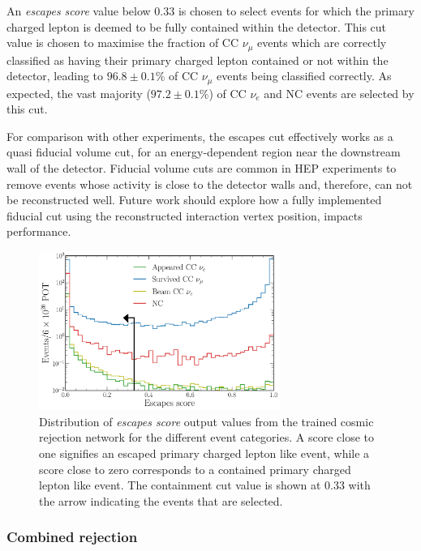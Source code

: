 An \emph{escapes score} value below $0.33$ is chosen to select events for which the primary
charged lepton is deemed to be fully contained within the detector. This cut value is chosen to
maximise the fraction of CC $\nu_{\mu}$ events which are correctly classified as having their
primary charged lepton contained or not within the detector, leading to $96.8\pm0.1\%$ of CC
$\nu_{\mu}$ events being classified correctly. As expected, the vast majority ($97.2\pm0.1\%$) of
CC $\nu_{e}$ and NC events are selected by this cut.

For comparison with other experiments, the escapes cut effectively works as a quasi fiducial
volume cut, for an energy-dependent region near the downstream wall of the detector. Fiducial
volume cuts are common in HEP experiments to remove events whose activity is close to the detector
walls and, therefore, can not be reconstructed well. Future work should explore how a fully
implemented fiducial cut using the reconstructed interaction vertex position, impacts performance.

\begin{figure} %
    \includegraphics[width=0.7\textwidth]{diagrams/7-results/final_escapes_outputs.pdf}
    \caption[Distribution of escapes score output values]
    {Distribution of \emph{escapes score} output values from the trained cosmic rejection network
        for the different event categories. A score close to one signifies an escaped primary
        charged lepton like event, while a score close to zero corresponds to a contained primary
        charged lepton like event. The containment cut value is shown at 0.33 with the arrow
        indicating the events that are selected.}
    \label{fig:final_escapes_outputs}
\end{figure}

\subsubsection*{Combined rejection} %

